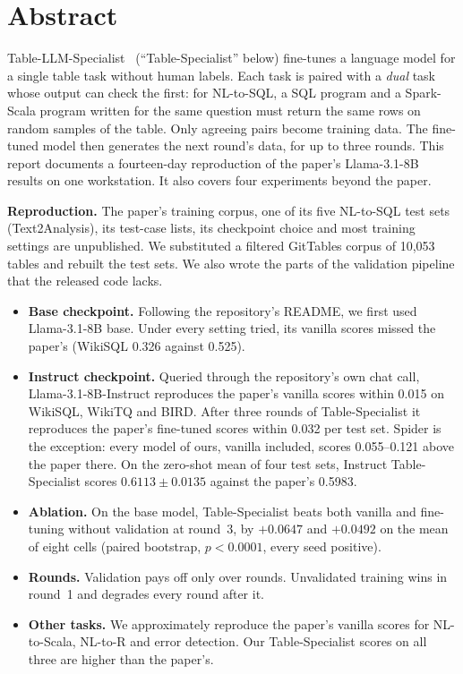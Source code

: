 \chapter*{Abstract}

Table-LLM-Specialist~\cite{xing2024tablellmspecialist} (``Table-Specialist'' below) fine-tunes a language model for a
single table task without human labels. Each task is paired with a \emph{dual} task whose output can check the first:
for NL-to-SQL, a SQL program and a Spark-Scala program written for the same question must return the same rows on
random samples of the table. Only agreeing pairs become training data. The fine-tuned model then generates the next
round's data, for up to three rounds. This report documents a fourteen-day reproduction of the paper's Llama-3.1-8B
results on one workstation. It also covers four experiments beyond the paper.

\textbf{Reproduction.} The paper's training corpus, one of its five NL-to-SQL test sets (Text2Analysis), its test-case
lists, its checkpoint choice and most training settings are unpublished. We substituted a filtered GitTables corpus of
10,053 tables and rebuilt the test sets. We also wrote the parts of the validation pipeline that the released code lacks.
\begin{itemize}
\item \textbf{Base checkpoint.} Following the repository's README, we first used Llama-3.1-8B base. Under every setting
tried, its vanilla scores missed the paper's (WikiSQL 0.326 against 0.525).
\item \textbf{Instruct checkpoint.} Queried through the repository's own chat call, Llama-3.1-8B-Instruct reproduces
the paper's vanilla scores within 0.015 on WikiSQL, WikiTQ and BIRD. After three rounds of Table-Specialist it
reproduces the paper's fine-tuned scores within 0.032 per test set. Spider is the exception: every model of ours,
vanilla included, scores 0.055--0.121 above the paper there. On the zero-shot mean of four test sets, Instruct
Table-Specialist scores $0.6113\pm0.0135$ against the paper's 0.5983.
\item \textbf{Ablation.} On the base model, Table-Specialist beats both vanilla and fine-tuning without validation at
round~3, by $+0.0647$ and $+0.0492$ on the mean of eight cells (paired bootstrap, $p<0.0001$, every seed positive).
\item \textbf{Rounds.} Validation pays off only over rounds. Unvalidated training wins in round~1 and degrades every
round after it.
\item \textbf{Other tasks.} We approximately reproduce the paper's vanilla scores for NL-to-Scala, NL-to-R and error
detection. Our Table-Specialist scores on all three are higher than the paper's.
\end{itemize}

